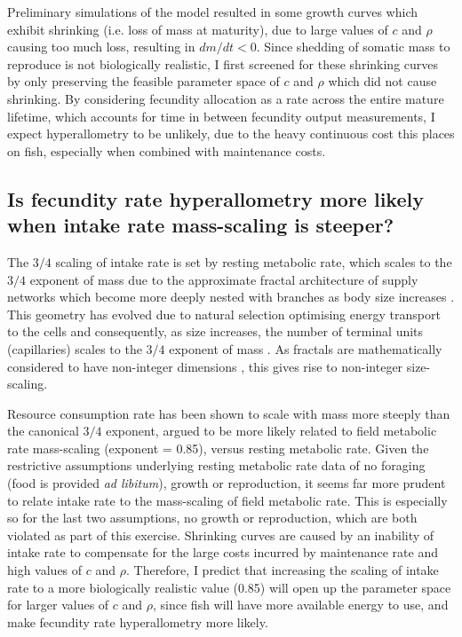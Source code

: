 \documentclass[a4paper]{article} %
\begin{document}
Preliminary simulations of the model resulted in some growth curves which exhibit shrinking (i.e. loss of mass at maturity), due to large values of $c$ and $\rho$ causing too much loss, resulting in $dm/dt < 0$. Since shedding of somatic mass to reproduce is not biologically realistic, I first screened for these shrinking curves by only preserving the feasible parameter space of $c$ and $\rho$ which did not cause shrinking.
By considering fecundity allocation as a rate across the entire mature lifetime, which accounts for time in between fecundity output measurements, I expect hyperallometry to be unlikely, due to the heavy continuous cost this places on fish, especially when combined with maintenance costs.

\subsection{Is fecundity rate hyperallometry more likely when intake rate mass-scaling is steeper?}

The $3/4$ scaling of intake rate is set by resting metabolic rate, which scales to the $3/4$ exponent of mass \autocite{Kleiber1947, peters1983, niklas1994plant} due to the approximate fractal architecture of supply networks which become more deeply nested with branches as body size increases \autocite{West1997}. This geometry has evolved due to natural selection optimising energy transport to the cells and consequently, as size increases, the number of terminal units (capillaries) scales to the $3/4$ exponent of mass \autocite{West1997, West2005}. As fractals are mathematically considered to have non-integer dimensions \autocite{Hausdorff1918, Mandelbrot1982}, this gives rise to non-integer size-scaling. 

Resource consumption rate has been shown to scale with mass more steeply than the canonical $3/4$ exponent, argued to be more likely related to field metabolic rate mass-scaling (exponent = 0.85), versus resting metabolic rate. Given the restrictive assumptions underlying resting metabolic rate data of no foraging (food is provided \textit{ad libitum}), growth or reproduction, it seems far more prudent to relate intake rate to the mass-scaling of field metabolic rate. This is especially so for the last two assumptions, no growth or reproduction, which are both violated as part of this exercise. Shrinking curves are caused by an inability of intake rate to compensate for the large costs incurred by maintenance rate and high values of $c$ and $\rho$. Therefore, I predict that increasing the scaling of intake rate to a more biologically realistic value (0.85) will open up the parameter space for larger values of $c$ and $\rho$, since fish will have more available energy to use, and make fecundity rate hyperallometry more likely.
\end{document}
